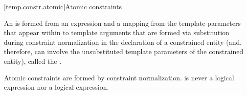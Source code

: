[temp.constr.atomic]{Atomic constraints}

\pnum
An  is formed from
an expression 
and a mapping from the template parameters
that appear within  to
template arguments that are formed via substitution during constraint normalization
in the declaration of a constrained entity (and, therefore, can involve the
unsubstituted template parameters of the constrained entity),
called the .
\begin{note}
Atomic constraints are formed by constraint normalization.
 is never a logical  expression
nor a logical  expression.
\end{note}

